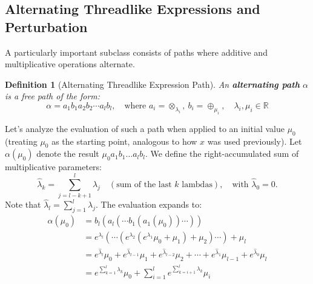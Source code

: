 \documentclass[12pt]{article}
\newtheorem{definition}{Definition}[section]
\begin{document}
\subsection{Alternating Threadlike Expressions and Perturbation} %

A particularly important subclass consists of paths where additive and multiplicative operations alternate.

\begin{definition}[Alternating Threadlike Expression Path]\label{def:alternating_path_cs}
An \textbf{alternating path} \( \alpha \) is a free path of the form:
\begin{equation}\label{eq:alternative_cs}
    \alpha = a_1 b_1 a_2 b_2 \cdots a_l b_l, \quad \text{where } a_i = \otimes_{\lambda_i}, \ b_i = \oplus_{\mu_i}, \quad \lambda_i, \mu_i \in \mathbb{R}
\end{equation}
\end{definition}

Let's analyze the evaluation of such a path when applied to an initial value \( \mu_0 \) (treating \( \mu_0 \) as the starting point, analogous to how \(x\) was used previously). Let \( \alpha(\mu_0) \) denote the result \( \mu_0 a_1 b_1 \dots a_l b_l \).
We define the right-accumulated sum of multiplicative parameters:
\begin{equation}
\hat{\lambda}_k = \sum_{j=l-k+1}^{l} \lambda_j \quad (\text{sum of the last } k \text{ lambdas}), \quad \text{with } \hat{\lambda}_0 = 0.
\end{equation}
Note that \( \hat{\lambda}_l = \sum_{j=1}^{l} \lambda_j \). The evaluation expands to:
\begin{align}
\alpha(\mu_0) &= b_l(a_l(\cdots b_1(a_1(\mu_0))\cdots)) \\
              &= e^{\lambda_l}(\cdots (e^{\lambda_2} (e^{\lambda_1} \mu_0 + \mu_1) + \mu_2) \cdots) + \mu_l \\
              &= e^{\hat{\lambda}_l} \mu_0 + e^{\hat{\lambda}_{l-1}} \mu_1 + e^{\hat{\lambda}_{l-2}} \mu_2 + \cdots + e^{\hat{\lambda}_1} \mu_{l-1} + e^{\hat{\lambda}_0} \mu_l \label{eq:alternating_expansion_cs}\\
              &= e^{\sum_{k=1}^l \lambda_k} \mu_0 + \sum_{i=1}^l e^{\sum_{k=i+1}^l \lambda_k} \mu_i \label{eq:alternating_expansion_alt_cs}
\end{align}
\end{document}
